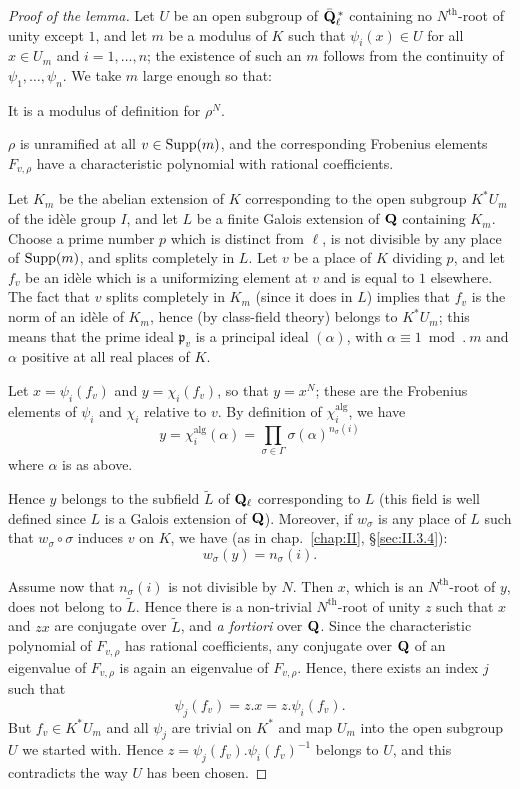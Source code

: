 \begin{proof}[Proof of the lemma]
Let $U$ be an open subgroup of $\bar{\mathbf{Q}}_\ell^{\,*}$ containing no
$N^{\mathrm{th}}$-root of unity except $1$, and let $m$ be a modulus
of $K$ such that $\psi_i(x)\in U$ for all $x\in U_m$ and
$i=1,\ldots,n$; the existence of such an $m$ follows from the
continuity of $\psi_1,\ldots,\psi_n$.  We take $m$ large enough so
that:
\begin{alist}[label=\alph*)]
\item It is a modulus of definition for $\rho^N$.
\item $\rho$ is unramified at all $v\in\mathrm{Supp}(m)$, and the
corresponding Frobenius elements $F_{v,\rho}$ have a characteristic
polynomial with rational coefficients.
\end{alist}
Let $K_m$ be the abelian extension of $K$ corresponding to the open
subgroup $K^*U_m$ of the idèle group $I$, and let $L$ be a finite
Galois extension of $\mathbf{Q}$ containing $K_m$.  Choose a prime number $p$
which is distinct from $\ell$, is not divisible by any place of
$\mathrm{Supp}(m)$, and splits completely in $L$.  Let $v$ be a place of $K$
dividing $p$, and let $f_v$ be an idèle which is a uniformizing
element at $v$ and is equal to $1$ elsewhere.  The fact that $v$
splits completely in $K_m$ (since it does in $L$) implies that $f_v$
is the norm of an idèle of $K_m$, hence (by class-field theory)
belongs to $K^*U_m$; this means that the prime ideal
$\mathfrak{p}_v$ is a principal ideal $(\alpha)$, with
$\alpha\equiv 1\bmod.\ m$ and $\alpha$ positive at all real places of
$K$.

Let $x=\psi_i(f_v)$ and $y=\chi_i(f_v)$, so that $y=x^N$; these are
the Frobenius elements of $\psi_i$ and $\chi_i$ relative to $v$.  By
definition of $\chi_i^{\mathrm{alg}}$, we have
\[
y=\chi_i^{\mathrm{alg}}(\alpha)
=\prod_{\sigma\in\Gamma}\sigma(\alpha)^{n_\sigma(i)}
\]
where $\alpha$ is as above.

Hence $y$ belongs to the subfield $\widetilde L$ of $\mathbf{Q}_\ell$
corresponding to $L$ (this field is well defined since $L$ is a
Galois extension of $\mathbf{Q}$).  Moreover, if $w_\sigma$ is any place of
$L$ such that $w_\sigma\circ\sigma$ induces $v$ on $K$, we have (as
in chap.~\ref{chap:II}, \S\ref{sec:II.3.4}):
\[
w_\sigma(y)=n_\sigma(i).
\]

Assume now that $n_\sigma(i)$ is not divisible by $N$.  Then $x$,
which is an $N^{\mathrm{th}}$-root of $y$, does not belong to
$\widetilde L$.  Hence there is a non-trivial
$N^{\mathrm{th}}$-root of unity $z$ such that $x$ and $zx$ are
conjugate over $\widetilde L$, and \emph{a fortiori} over $\mathbf{Q}$.
Since the characteristic polynomial of $F_{v,\rho}$ has rational
coefficients, any conjugate over $\mathbf{Q}$ of an eigenvalue of
$F_{v,\rho}$ is again an eigenvalue of $F_{v,\rho}$.  Hence, there
exists an index $j$ such that
\[
\psi_j(f_v)=z.x=z.\psi_i(f_v).
\]
But $f_v\in K^*U_m$ and all $\psi_j$ are trivial on $K^*$ and map
$U_m$ into the open subgroup $U$ we started with.  Hence
$z=\psi_j(f_v).\psi_i(f_v)^{-1}$ belongs to $U$, and this
contradicts the way $U$ has been chosen.
\end{proof}

